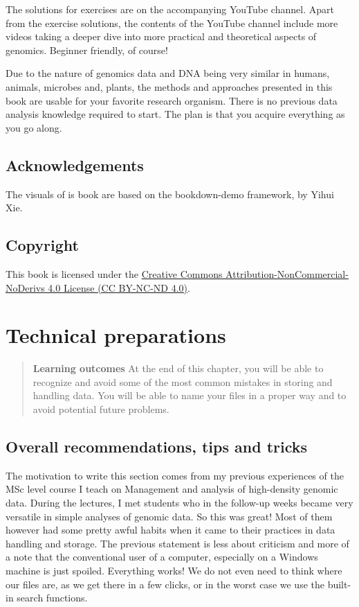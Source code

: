 \documentclass[]{book}
\begin{document}
The solutions for exercises are on the accompanying YouTube channel.
Apart from the exercise solutions, the contents of the YouTube channel
include more videos taking a deeper dive into more practical and
theoretical aspects of genomics. Beginner friendly, of course!

Due to the nature of genomics data and DNA being very similar in humans,
animals, microbes and, plants, the methods and approaches presented in
this book are usable for your favorite research organism. There is no
previous data analysis knowledge required to start. The plan is that you
acquire everything as you go along.

\section{Acknowledgements}\label{acknowledgements}

The visuals of is book are based on the bookdown-demo framework, by
Yihui Xie.

\section{Copyright}\label{copyright}

This book is licensed under the
\href{https://creativecommons.org/licenses/by-nc-nd/4.0/}{Creative
Commons Attribution-NonCommercial-NoDerivs 4.0 License (CC BY-NC-ND
4.0)}.

\chapter{Technical preparations}\label{technical-preparations}

\begin{quote}
\textbf{Learning outcomes} At the end of this chapter, you will be able
to recognize and avoid some of the most common mistakes in storing and
handling data. You will be able to name your files in a proper way and
to avoid potential future problems.
\end{quote}

\hypertarget{overall-recommendations-tips-and-tricks}{\section{Overall
recommendations, tips and
tricks}\label{overall-recommendations-tips-and-tricks}}

The motivation to write this section comes from my previous experiences
of the MSc level course I teach on Management and analysis of
high-density genomic data. During the lectures, I met students who in
the follow-up weeks became very versatile in simple analyses of genomic
data. So this was great! Most of them however had some pretty awful
habits when it came to their practices in data handling and storage. The
previous statement is less about criticism and more of a note that the
conventional user of a computer, especially on a Windows machine is just
spoiled. Everything works! We do not even need to think where our files
are, as we get there in a few clicks, or in the worst case we use the
built-in search functions.
\end{document}
